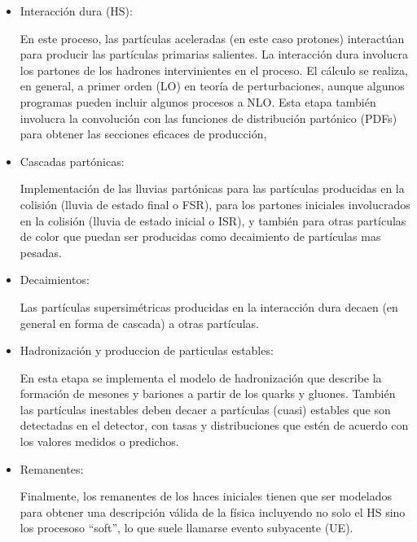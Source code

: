 \begin{itemize}

\item Interacción dura (HS):

  En este proceso, las partículas aceleradas (en este caso protones) interactúan
  para producir las partículas primarias salientes. La interacción dura
  involucra los partones de los hadrones intervinientes en el proceso. El
  cálculo se realiza, en general, a primer orden (LO) en teoría de
  perturbaciones, aunque algunos programas pueden incluir algunos procesos a
  NLO. Esta etapa también involucra la convolución con las funciones de
  distribución partónico (PDFs) para obtener las secciones eficaces de producción,

\item Cascadas partónicas:

  Implementación de las lluvias partónicas para las partículas producidas en la
  colisión (lluvia de estado final o FSR), para los partones iniciales
  involucrados en la colisión (lluvia de estado inicial o ISR), y también para
  otras partículas de color que puedan ser producidas como decaimiento de
  partículas mas pesadas.


\item Decaimientos:

  Las partículas supersimétricas producidas en la interacción dura decaen (en
  general en forma de cascada) a otras partículas.


\item Hadronización y produccion de particulas estables:

  En esta etapa se implementa el modelo de hadronización que describe la
  formación de mesones y bariones a partir de los quarks y gluones. También las
  partículas inestables deben decaer a partículas (cuasi) estables que son
  detectadas en el detector, con tasas y distribuciones que estén de acuerdo con
  los valores medidos o predichos.

\item Remanentes:

  Finalmente, los remanentes de los haces iniciales tienen que ser
  modelados para obtener una descripción válida de la física incluyendo
  no solo el HS sino los procesoso ``soft'', lo que suele llamarse evento subyacente (UE).

\end{itemize}

